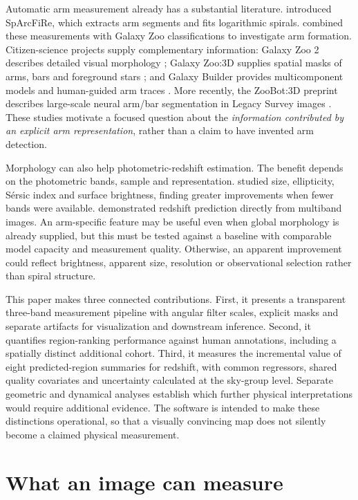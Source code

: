 \documentclass[11pt]{article}
\begin{document}
Automatic arm measurement already has a substantial literature.
\citet{davis2014} introduced SpArcFiRe, which extracts arm segments and fits
logarithmic spirals. \citet{hart2017} combined these measurements with Galaxy Zoo
classifications to investigate arm formation. Citizen-science projects supply
complementary information: Galaxy Zoo 2 describes detailed visual morphology
\citep{willett2013}; Galaxy Zoo:3D supplies spatial masks of arms, bars and
foreground stars \citep{masters2021}; and Galaxy Builder provides multicomponent
models and human-guided arm traces \citep{lingard2020,lingard2021}. More recently,
the ZooBot:3D preprint describes large-scale neural arm/bar segmentation in
Legacy Survey images \citep{spindler2026}. These studies motivate a focused
question about the \emph{information contributed by an explicit arm representation},
rather than a claim to have invented arm detection.

Morphology can also help photometric-redshift estimation. The benefit depends
on the photometric bands, sample and representation. \citet{soo2018} studied
size, ellipticity, S\'ersic index and surface brightness, finding greater
improvements when fewer bands were available. \citet{pasquet2019} demonstrated
redshift prediction directly from multiband images. An arm-specific feature
may be useful even when global morphology is already supplied, but this must
be tested against a baseline with comparable model capacity and measurement
quality. Otherwise, an apparent improvement could reflect brightness, apparent
size, resolution or observational selection rather than spiral structure.

This paper makes three connected contributions. First, it presents a transparent
three-band measurement pipeline with angular filter scales, explicit masks and
separate artifacts for visualization and downstream inference. Second, it
quantifies region-ranking performance against human annotations, including a
spatially distinct additional cohort. Third, it measures the incremental value
of eight predicted-region summaries for redshift, with common regressors,
shared quality covariates and uncertainty calculated at the sky-group level.
Separate geometric and dynamical analyses establish which further physical
interpretations would require additional evidence. The software is intended
to make these distinctions operational, so that a visually convincing map
does not silently become a claimed physical measurement.

\section{What an image can measure}
\label{sec:theory}
\end{document}

